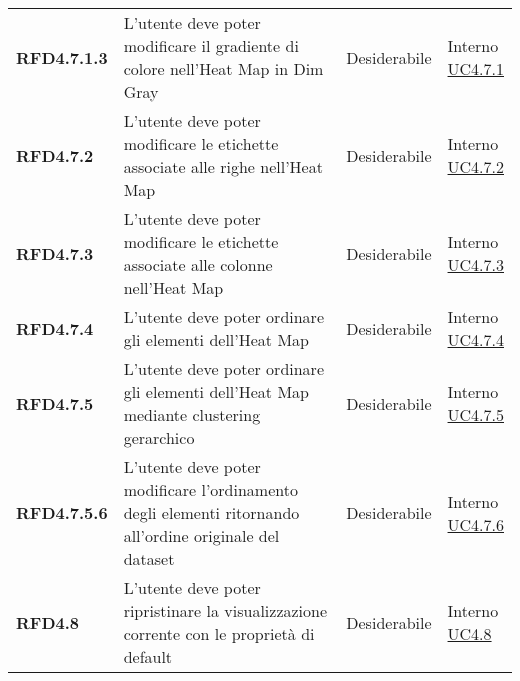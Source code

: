 \begin{longtable}[H]{| >{\raggedright\bfseries}m{20mm} | >{\raggedright}m{90mm} | >{\centering}m{25mm} | >{\centering\arraybackslash}m{30mm}|}
    RFD4.7.1.3
     & L'utente deve poter modificare il gradiente di colore nell'Heat Map in Dim Gray
     & Desiderabile
     & \makecell{ Interno                                                                                                \\  \hyperref[par:uc4.7.1]{UC4.7.1} }\\

    RFD4.7.2
     & L'utente deve poter modificare le etichette associate alle righe nell'Heat Map
     & Desiderabile
     & \makecell{ Interno                                                                                                \\  \hyperref[par:uc4.7.2]{UC4.7.2} }\\

    RFD4.7.3
     & L'utente deve poter modificare le etichette associate alle colonne nell'Heat Map
     & Desiderabile
     & \makecell{ Interno                                                                                                \\  \hyperref[par:uc4.7.3]{UC4.7.3} }\\

    RFD4.7.4
     & L'utente deve poter ordinare gli elementi dell'Heat Map
     & Desiderabile
     & \makecell{ Interno                                                                                                \\  \hyperref[par:uc4.7.4]{UC4.7.4} }\\

    RFD4.7.5
     & L'utente deve poter ordinare gli elementi dell'Heat Map mediante clustering gerarchico
     & Desiderabile
     & \makecell{ Interno                                                                                                \\  \hyperref[spar:uc4.7.5]{UC4.7.5} }\\

    RFD4.7.5.6
     & L'utente deve poter modificare l'ordinamento degli elementi ritornando all'ordine originale del dataset
     & Desiderabile
     & \makecell{ Interno                                                                                                \\  \hyperref[spar:uc4.7.6]{UC4.7.6} }\\

    RFD4.8
     & L'utente deve poter ripristinare la visualizzazione corrente con le proprietà di default
     & Desiderabile
     & \makecell{ Interno                                                                                                \\  \hyperref[ssub:uc4.8]{UC4.8} }\\


\end{longtable}
